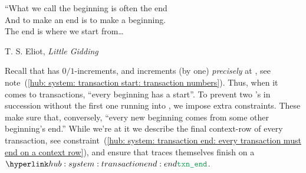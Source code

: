 \epigraph{
	“What we call the beginning is often the end \\
	And to make an end is to make a beginning.   \\
	The end is where we start from\dots{}}
{T. S. Eliot, \textit{Little Gidding}}

\noindent Recall that \totalTransactionNumber{} has $0/1$-increments, and increments (by one) \emph{precisely} at \transactionStart{},
see note~(\ref{hub: system: transaction start: transaction numbers}).
Thus, when it comes to transactions, ``every beginning has a start''.
To prevent two \transactionStart{}'s in succession without the first one running into \transactionEnd{},
we impose extra constraints.
These make sure that, conversely,
``every new beginning comes from some other beginning's end.''
While we're at it we describe the final context-row of every transaction,
see constraint~(\ref{hub: system: transaction end: every transaction must end on a context row}),
and ensure that traces themselves finish on a $\transactionEnd$.
